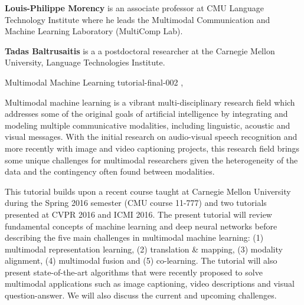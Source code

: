 \begin{bio}
  {\bfseries Louis-Philippe Morency} is an associate professor at CMU Language
  Technology Institute where he leads the Multimodal Communication and Machine
  Learning Laboratory (MultiComp Lab). 

  {\bfseries Tadas Baltrusaitis} is a a postdoctoral researcher at the Carnegie
  Mellon University, Language Technologies Institute.

\end{bio}

\begin{tutorial}
  {Multimodal Machine Learning}
  {tutorial-final-002}
  {\daydateyear, \tutorialmorningtime}
  {\TutLocB}

Multimodal machine learning is a vibrant multi-disciplinary research field
which addresses some of the original goals of artificial intelligence by
integrating and modeling multiple communicative modalities, including
linguistic, acoustic and visual messages. With the initial research on
audio-visual speech recognition and more recently with image and video
captioning projects, this research field brings some unique challenges for
multimodal researchers given the heterogeneity of the data and the contingency
often found between modalities.

This tutorial builds upon a recent course taught at Carnegie Mellon University
during the Spring 2016 semester (CMU course 11-777) and two tutorials
presented at CVPR 2016 and ICMI 2016. The present tutorial will review
fundamental concepts of machine learning and deep neural networks before
describing the five main challenges in multimodal machine learning: (1)
multimodal representation learning, (2) translation & mapping, (3) modality
alignment, (4) multimodal fusion and (5) co-learning. The tutorial will also
present state-of-the-art algorithms that were recently proposed to solve
multimodal applications such as image captioning, video descriptions and
visual question-answer. We will also discuss the current and upcoming
challenges.

\end{tutorial}